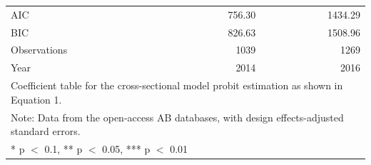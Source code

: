 \documentclass[floatsintext,man]{apa7}\usepackage[]{graphicx}\usepackage[]{color}
\begin{document}
\begin{longtable}[t]{lrr}
\midrule
AIC & \num{756.30} & \num{1434.29}\\
BIC & \num{826.63} & \num{1508.96}\\
Observations & 1039 & 1269\\
Year & 2014 & 2016\\
\bottomrule
\multicolumn{3}{l}{\rule{0pt}{1em}Coefficient table for the cross-sectional model probit estimation as shown in Equation 1.}\\
\multicolumn{3}{l}{\rule{0pt}{1em}Note: Data from the open-access AB databases, with design effects-adjusted standard errors.}\\
\multicolumn{3}{l}{\rule{0pt}{1em}* p $<$ 0.1, ** p $<$ 0.05, *** p $<$ 0.01}\\
\end{longtable}


\end{document}
